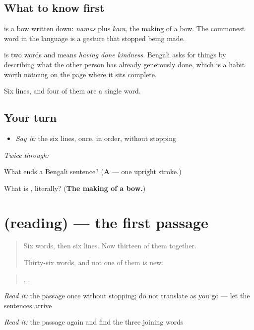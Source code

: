 \subsection*{What to know first}
\textbf{} is a bow written down: \emph{namas} plus \emph{kara}, the making of a bow. The commonest word in the language is a gesture that stopped being made.

\textbf{ } is two words and means \emph{having done kindness}. Bengali asks for things by describing what the other person has already generously done, which is a habit worth noticing on the page where it sits complete.

Six lines, and four of them are a single word.

\subsection*{Your turn}
\begin{itemize}
\raggedright
  \item \emph{Say it:} the six lines, once, in order, without stopping
\end{itemize}

\emph{Twice through:}

\begin{tcolorbox}[breakable,colback=teal!4,colframe=teal!35!black,title={Before you move on}]
What ends a Bengali sentence? (\textbf{A } — one upright stroke.)

What is \textbf{}, literally? (\textbf{The making of a bow.})
\end{tcolorbox}
\section[(reading)]{(reading) — the first passage}

\label{lesson:BN-C40-prothom-path}



\begin{quote}
Six words, then six lines. Now thirteen of them together.

Thirty-six words, and not one of them is new.
\end{quote}

\begin{tcolorbox}[breakable,skin=enhanced,colback=orange!6,colframe=orange!45!black,boxrule=0.5pt,arc=1mm,left=6pt,right=6pt,top=4pt,bottom=4pt,fonttitle=\bfseries,title={Read this}]
\begin{quote}
                          ,       ,  
\end{quote}

\emph{Read it:} the passage once without stopping; do not translate as you go — let the sentences arrive

\emph{Read it:} the passage again and find the three joining words
\end{tcolorbox}

